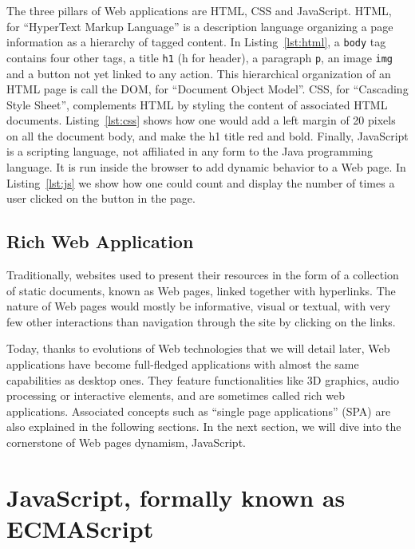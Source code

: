 The three pillars of Web applications are HTML, CSS and JavaScript.
HTML, for ``HyperText Markup Language'' is a description language
organizing a page information as a hierarchy of tagged content.
In Listing~\ref{lst:html}, a \verb|body| tag contains four other tags,
a title \verb|h1| (h for header), a paragraph \verb|p|, an image \verb|img|
and a button not yet linked to any action.
This hierarchical organization of an HTML page is call the DOM,
for ``Document Object Model''.
CSS, for ``Cascading Style Sheet'', complements HTML by styling
the content of associated HTML documents.
Listing~\ref{lst:css} shows how one would add a left margin of 20 pixels
on all the document body, and make the h1 title red and bold.
Finally, JavaScript is a scripting language, not affiliated in any form
to the Java programming language.
It is run inside the browser to add dynamic behavior to a Web page.
In Listing~\ref{lst:js} we show how one could count and display
the number of times a user clicked on the button in the page.





\subsection{Rich Web Application}%
\label{sub:rich_web_application}

Traditionally, websites used to present their resources in the form of a collection
of static documents, known as Web pages, linked together with hyperlinks.
The nature of Web pages would mostly be informative, visual or textual,
with very few other interactions than navigation through the site by
clicking on the links.

Today, thanks to evolutions of Web technologies that we will detail later,
Web applications have become full-fledged applications with almost
the same capabilities as desktop ones.
They feature functionalities like 3D graphics, audio processing or interactive elements,
and are sometimes called rich web applications.
Associated concepts such as ``single page applications'' (SPA)
are also explained in the following sections.
In the next section, we will dive into the cornerstone of Web pages dynamism, JavaScript.


\section{JavaScript, formally known as ECMAScript}%
\label{sec:javascript_formally_known_as_ecmascript}

